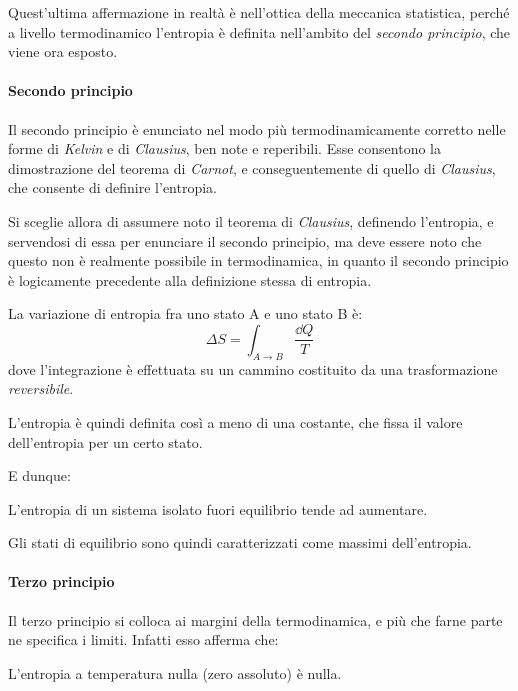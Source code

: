 Quest'ultima affermazione in realtà è nell'ottica della meccanica statistica, perché a livello termodinamico l'entropia è definita nell'ambito del \textit{secondo principio}, che viene ora esposto.

\paragraph{Secondo principio} Il secondo principio è enunciato nel modo più termodinamicamente corretto nelle forme di \textit{Kelvin} e di \textit{Clausius}, ben note e reperibili. Esse consentono la dimostrazione del teorema di \textit{Carnot}, e conseguentemente di quello di \textit{Clausius}, che consente di definire l'entropia.

Si sceglie allora di assumere noto il teorema di \textit{Clausius}, definendo l'entropia, e servendosi di essa per enunciare il secondo principio, ma deve essere noto che questo non è realmente possibile in termodinamica, in quanto il secondo principio è logicamente precedente alla definizione stessa di entropia.

\begin{defn}[Entropia]
	La variazione di entropia fra uno stato A e uno stato B è:
	\begin{equation*}
	\Delta S = \int_{A \rightarrow B} \frac{\dd Q}{T}
	\end{equation*}
	dove l'integrazione è effettuata su un cammino costituito da una trasformazione \textit{reversibile}.
	
	L'entropia è quindi definita così a meno di una costante, che fissa il valore dell'entropia per un certo stato.
\end{defn}

\noindent E dunque:

\begin{defn}
	L'entropia di un sistema isolato fuori equilibrio tende ad aumentare.
\end{defn}

\noindent Gli stati di equilibrio sono quindi caratterizzati come massimi dell'entropia.

\paragraph{Terzo principio} Il terzo principio si colloca ai margini della termodinamica, e più che farne parte ne specifica i limiti. Infatti esso afferma che:

\begin{defn}
	L'entropia a temperatura nulla (zero assoluto) è nulla.
\end{defn}

